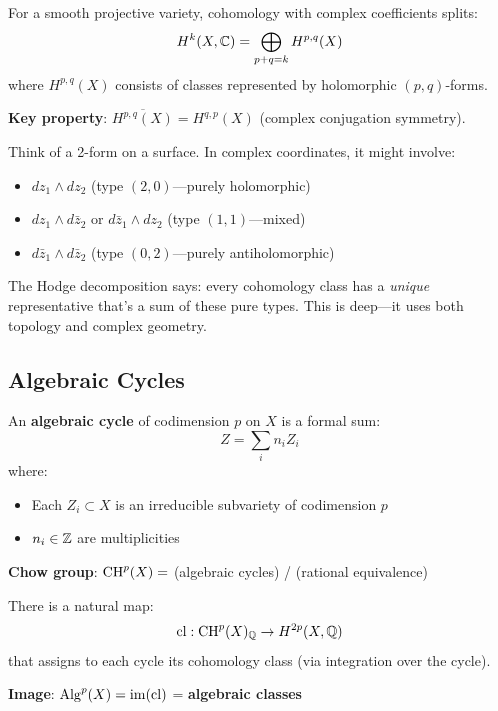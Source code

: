 \begin{defn}\label{def:hodge-decomposition}
For a smooth projective variety, cohomology with complex coefficients splits:
\begin{equation}
H^k(X, \mathbb{C}) = \bigoplus_{p+q=k} H^{p,q}(X)
\end{equation}
where $H^{p,q}(X)$ consists of classes represented by holomorphic $(p,q)$-forms.

\textbf{Key property}: $\overline{H^{p,q}(X)} = H^{q,p}(X)$ (complex conjugation symmetry).
\end{defn}

\begin{intuitive}
Think of a 2-form on a surface. In complex coordinates, it might involve:
\begin{itemize}
\item $dz_1 \wedge dz_2$ (type $(2,0)$—purely holomorphic)
\item $dz_1 \wedge d\bar{z}_2$ or $d\bar{z}_1 \wedge dz_2$ (type $(1,1)$—mixed)
\item $d\bar{z}_1 \wedge d\bar{z}_2$ (type $(0,2)$—purely antiholomorphic)
\end{itemize}

The Hodge decomposition says: every cohomology class has a \textit{unique} representative that's a sum of these pure types. This is deep—it uses both topology and complex geometry.
\end{intuitive}

\subsection{Algebraic Cycles}

\begin{defn}\label{def:algebraic-cycles}
An \textbf{algebraic cycle} of codimension $p$ on $X$ is a formal sum:
\begin{equation}
Z = \sum_{i} n_i Z_i
\end{equation}
where:
\begin{itemize}
\item Each $Z_i \subset X$ is an irreducible subvariety of codimension $p$
\item $n_i \in \mathbb{Z}$ are multiplicities
\end{itemize}

\textbf{Chow group}: $\mathrm{CH}^p(X) = $ (algebraic cycles) / (rational equivalence)
\end{defn}

\begin{defn}\label{def:cycle-class-map}
There is a natural map:
\begin{equation}
\operatorname{cl}: \mathrm{CH}^p(X)_{\mathbb{Q}} \to H^{2p}(X, \mathbb{Q})
\end{equation}
that assigns to each cycle its cohomology class (via integration over the cycle).

\textbf{Image}: $\operatorname{Alg}^p(X) = \operatorname{im}(\operatorname{cl})$ = \textbf{algebraic classes}
\end{defn}

